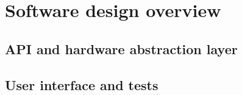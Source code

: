 \section{Software design overview}
\label{s:swOverview}

\subsection{API and hardware abstraction layer}
\label{ss:core}



\subsection{User interface and tests}
\label{ss:ui}

